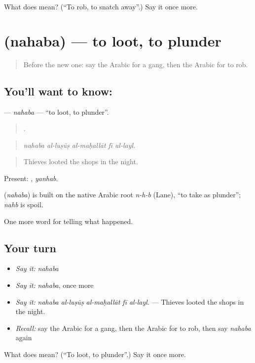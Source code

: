 \begin{tcolorbox}[breakable,colback=teal!4,colframe=teal!35!black,title={Before you move on}]
What does  mean? (\textquotedblleft{}To rob, to snatch away\textquotedblright{}.) Say it once more.
\end{tcolorbox}
\section[\texorpdfstring{\ar{نهب} (nahaba)}{نهب (nahaba)}]{ (nahaba) — to loot, to plunder}

\label{lesson:AR-C321-nahaba}



\begin{quote}
Before the new one: say the Arabic for a gang, then the Arabic for to rob.
\end{quote}

\subsection*{You'll want to know: }
\textbf{} — \emph{nahaba} — \textquotedblleft{}to loot, to plunder\textquotedblright{}.

\begin{quote}
    .
\end{quote}

\begin{quote}
\emph{nahaba al-luṣūṣ al-maḥallāt fī al-layl.}
\end{quote}

\begin{quote}
Thieves looted the shops in the night.
\end{quote}

Present: , \emph{yanhab}.

\begin{cousinweb}
\textbf{} (\emph{nahaba}) is built on the native Arabic root \emph{n-h-b} (Lane), \textquotedblleft{}to take as plunder\textquotedblright{}; \emph{nahb} is spoil.
\end{cousinweb}

\begin{grammarlens}[title={What you've built}]
One more word for telling what happened.
\end{grammarlens}

\subsection*{Your turn}
\begin{itemize}
\raggedright
  \item \emph{Say it:} \emph{nahaba}
  \item \emph{Say it:} \emph{nahaba}, once more
  \item \emph{Say it:} \emph{nahaba al-luṣūṣ al-maḥallāt fī al-layl.} — Thieves looted the shops in the night.
  \item \emph{Recall:} say the Arabic for a gang, then the Arabic for to rob, then say \emph{nahaba} again
\end{itemize}

\begin{tcolorbox}[breakable,colback=teal!4,colframe=teal!35!black,title={Before you move on}]
What does  mean? (\textquotedblleft{}To loot, to plunder\textquotedblright{}.) Say it once more.
\end{tcolorbox}
